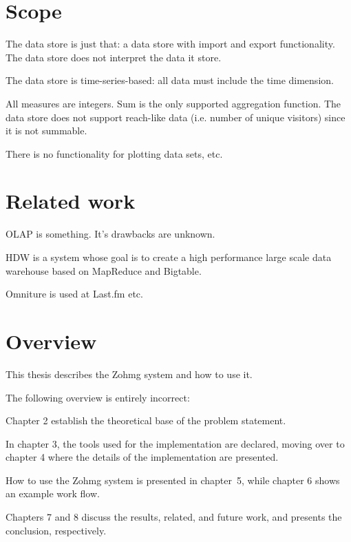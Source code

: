 \section{Scope}


The data store is just that: a data store with import and export
functionality. The data store does not interpret the data it store.

The data store is time-series-based: all data must include the time dimension.

All measures are integers. Sum is the only supported aggregation function. The
data store does not support reach-like data (i.e. number of unique visitors)
since it is not summable.

There is no functionality for plotting data sets, etc.



\section{Related work}


OLAP is something. It's drawbacks are unknown.

HDW is a system whose goal is to create a high performance large scale data
warehouse based on MapReduce and Bigtable. \cite{hdw}

Omniture is used at Last.fm etc.


\section{Overview}

This thesis describes the Zohmg system and how to use it.

The following overview is entirely incorrect:

Chapter 2 establish the theoretical base of the problem statement.

In chapter 3, the tools used for the implementation are declared, moving
over to chapter 4 where the details of the implementation are presented.

How to use the Zohmg system is presented in chapter~5, while chapter 6
shows an example work flow.

Chapters 7 and 8 discuss the results, related, and future work, and
presents the conclusion, respectively.



